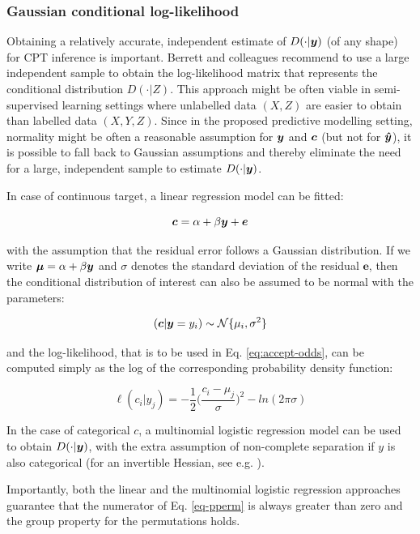 \documentclass{article}
\begin{document}
\subsubsection*{Gaussian conditional log-likelihood}


Obtaining a relatively accurate, independent estimate of $D(\cdot|\boldsymbol{y})$ (of any shape) for CPT inference is important. Berrett and colleagues recommend to use a large independent sample to obtain the log-likelihood matrix that represents the conditional distribution $D(\cdot|Z)$. This approach might be often viable in semi-supervised learning settings where unlabelled data $(X, Z)$ are easier to obtain than labelled data $(X, Y, Z)$.
Since in the proposed predictive modelling setting, normality might be often a reasonable assumption for $\boldsymbol{y}$ and $\boldsymbol{c}$ (but not for $\boldsymbol{\hat{y}}$), it is possible to fall back to Gaussian assumptions and thereby eliminate the need for a large, independent sample to estimate $D(\cdot|\boldsymbol{y})$.

In case of continuous target, a linear regression model  can be fitted:

\begin{equation}
    \label{eq:linreg}
    \boldsymbol{c} = \alpha + \beta \boldsymbol{y} + \boldsymbol{e}
\end{equation}


with the assumption that the residual error follows a Gaussian distribution. If we write $\boldsymbol{\mu} = \alpha + \beta \boldsymbol{y}$ and $\sigma$ denotes the standard deviation of the residual $\boldsymbol{e}$, then the conditional distribution of interest can also be assumed to be normal with the parameters:

$$ (\boldsymbol{c}|\boldsymbol{y}=y_i) \sim \mathcal{N}\{\mu_i, \sigma^2\}$$

and the log-likelihood, that is to be used in Eq. \ref{eq:accept-odds}, can be computed simply as the log of the corresponding probability density function:

$$ \ell(c_i|y_j) = - \frac{1}{2} \Big(\frac{c_i-\mu_j}{\sigma}\Big)^2 - ln(2 \pi \sigma)   $$

In the case of categorical $c$, a multinomial logistic regression model can be used to obtain $D(\cdot|\boldsymbol{y})$, with the extra assumption of non-complete separation if $y$ is also categorical (for an invertible Hessian, see e.g. \citep{bohning1992multinomial}).

Importantly, both the linear and the multinomial logistic regression approaches guarantee that the numerator of Eq. \ref{eq-pperm} is always greater than zero and the group property for the permutations holds.
\end{document}
